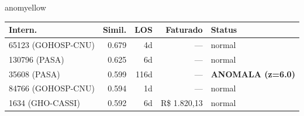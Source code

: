 \documentclass[a4paper,10pt]{article}
\begin{document}
\begin{anomalycard}[Internacao 97412 | GHO-PETROBRAS | MODERADO (z=2.25)]{anomyellow}
\begin{tabular}{l r r r l}\toprule\textbf{Intern.} & \textbf{Simil.} & \textbf{LOS} & \textbf{Faturado} & \textbf{Status} \\\midrule
65123 (GOHOSP-CNU) & 0.679 & 4d & --- & \textcolor{jcubeblue}{normal} \\
130796 (PASA) & 0.625 & 6d & --- & \textcolor{jcubeblue}{normal} \\
35608 (PASA) & 0.599 & 116d & --- & \textcolor{anomred}{\textbf{ANOMALA (z=6.0)}} \\
84766 (GOHOSP-CNU) & 0.594 & 1d & --- & \textcolor{jcubeblue}{normal} \\
1634 (GHO-CASSI) & 0.592 & 6d & R\$ 1.820,13 & \textcolor{jcubeblue}{normal} \\
\bottomrule\end{tabular}


\end{anomalycard}

\newpage
\end{document}
